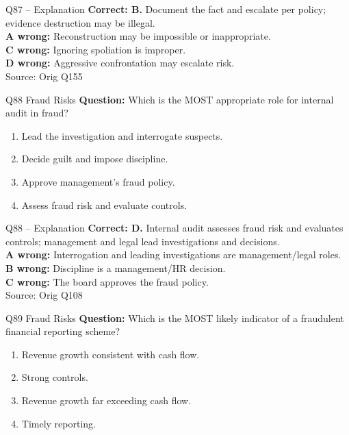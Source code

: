 \documentclass[aspectratio=169,10pt]{beamer}
\begin{document}
\begin{frame}[t]{Q87 -- Explanation}
	\footnotesize
	\textbf{Correct: B.} Document the fact and escalate per policy; evidence destruction may be illegal. \\[5pt]
\textbf{A wrong:} Reconstruction may be impossible or inappropriate. \\[3pt]
\textbf{C wrong:} Ignoring spoliation is improper. \\[3pt]
\textbf{D wrong:} Aggressive confrontation may escalate risk. \\[3pt]
	\vfill {\tiny Source: Orig Q155}
\end{frame}

\begin{frame}[t]{Q88 \hfill {\scriptsize Fraud Risks}}
	\small
	\textbf{Question:} Which is the MOST appropriate role for internal audit in fraud?
	\begin{enumerate}[label=\Alph*.,itemsep=1pt,topsep=3pt]
			\item Lead the investigation and interrogate suspects.
			\item Decide guilt and impose discipline.
			\item Approve management's fraud policy.
			\item Assess fraud risk and evaluate controls.
	\end{enumerate}
\end{frame}

\begin{frame}[t]{Q88 -- Explanation}
	\footnotesize
	\textbf{Correct: D.} Internal audit assesses fraud risk and evaluates controls; management and legal lead investigations and decisions. \\[5pt]
\textbf{A wrong:} Interrogation and leading investigations are management/legal roles. \\[3pt]
\textbf{B wrong:} Discipline is a management/HR decision. \\[3pt]
\textbf{C wrong:} The board approves the fraud policy. \\[3pt]
	\vfill {\tiny Source: Orig Q108}
\end{frame}

\begin{frame}[t]{Q89 \hfill {\scriptsize Fraud Risks}}
	\small
	\textbf{Question:} Which is the MOST likely indicator of a fraudulent financial reporting scheme?
	\begin{enumerate}[label=\Alph*.,itemsep=1pt,topsep=3pt]
			\item Revenue growth consistent with cash flow.
			\item Strong controls.
			\item Revenue growth far exceeding cash flow.
			\item Timely reporting.
	\end{enumerate}
\end{frame}
\end{document}
